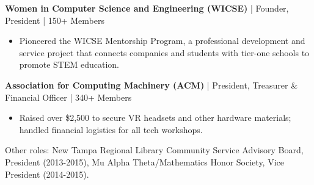 
\textbf{Women in Computer Science and Engineering (WICSE)} | Founder, President | 150+ Members
\begin{itemize}
\item Pioneered the WICSE Mentorship Program, a professional development and service project that connects companies and students with tier-one schools to promote STEM education.                                                 
\end{itemize}

\textbf{Association for Computing Machinery (ACM)} | President, Treasurer \&  Financial Officer | 340+ Members		
\begin{itemize}
\item Raised over \$2,500 to secure VR headsets and other hardware materials; handled financial logistics for all tech workshops.        
\end{itemize}
Other roles: New Tampa Regional Library Community Service Advisory Board, President (2013-2015), Mu Alpha Theta/Mathematics Honor Society, Vice President (2014-2015).
                 
